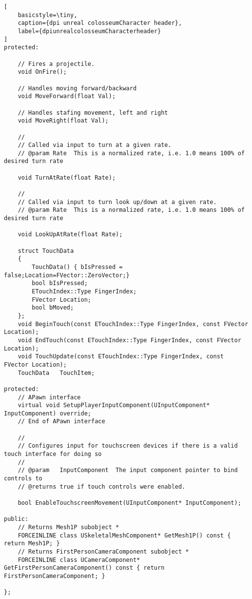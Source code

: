 \begin{lstlisting}[
	basicstyle=\tiny, 
	caption={dpi unreal colosseumCharacter header}, 
	label={dpiunrealcolosseumCharacterheader}
]
protected:
	
	// Fires a projectile. 
	void OnFire();

	// Handles moving forward/backward 
	void MoveForward(float Val);

	// Handles stafing movement, left and right 
	void MoveRight(float Val);

	//
	// Called via input to turn at a given rate.
	// @param Rate	This is a normalized rate, i.e. 1.0 means 100% of desired turn rate
	 
	void TurnAtRate(float Rate);

	//
	// Called via input to turn look up/down at a given rate.
	// @param Rate	This is a normalized rate, i.e. 1.0 means 100% of desired turn rate
	 
	void LookUpAtRate(float Rate);

	struct TouchData
	{
		TouchData() { bIsPressed = false;Location=FVector::ZeroVector;}
		bool bIsPressed;
		ETouchIndex::Type FingerIndex;
		FVector Location;
		bool bMoved;
	};
	void BeginTouch(const ETouchIndex::Type FingerIndex, const FVector Location);
	void EndTouch(const ETouchIndex::Type FingerIndex, const FVector Location);
	void TouchUpdate(const ETouchIndex::Type FingerIndex, const FVector Location);
	TouchData	TouchItem;
	
protected:
	// APawn interface
	virtual void SetupPlayerInputComponent(UInputComponent* InputComponent) override;
	// End of APawn interface

	//
	// Configures input for touchscreen devices if there is a valid touch interface for doing so 
	//
	// @param	InputComponent	The input component pointer to bind controls to
	// @returns true if touch controls were enabled.
	 
	bool EnableTouchscreenMovement(UInputComponent* InputComponent);

public:
	// Returns Mesh1P subobject *
	FORCEINLINE class USkeletalMeshComponent* GetMesh1P() const { return Mesh1P; }
	// Returns FirstPersonCameraComponent subobject *
	FORCEINLINE class UCameraComponent* GetFirstPersonCameraComponent() const { return FirstPersonCameraComponent; }

};

\end{lstlisting}

